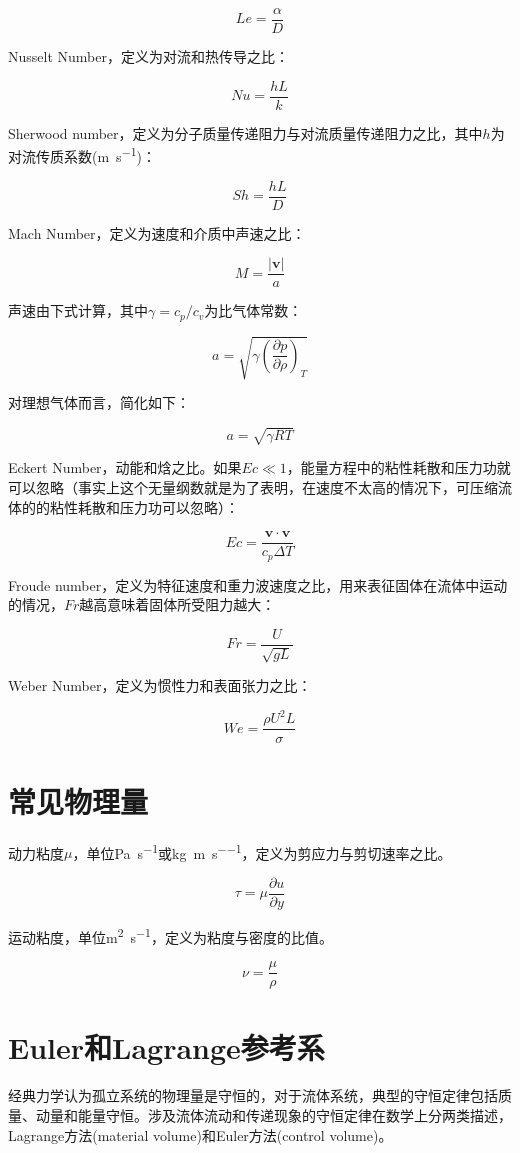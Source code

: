 \[Le = \frac{\alpha}{D}\]

Nusselt Number，定义为对流和热传导之比：

\[Nu = \frac{hL}{k}\]

Sherwood number，定义为分子质量传递阻力与对流质量传递阻力之比，其中$ h $为对流传质系数(\si{\meter\per\second})：

\[Sh = \frac{hL}{D}\]

Mach Number，定义为速度和介质中声速之比：

\[ M = \frac{|\mathbf{v}|}{a} \]

声速由下式计算，其中$ \gamma=c_p/c_v $为比气体常数：

\[a=\sqrt{\gamma\left( \frac{\partial p}{\partial \rho} \right)_T}\]

对理想气体而言，简化如下：

\[a=\sqrt{\gamma RT}\]

Eckert Number，动能和焓之比。如果$ Ec\ll 1 $，能量方程中的粘性耗散和压力功就可以忽略（事实上这个无量纲数就是为了表明，在速度不太高的情况下，可压缩流体的的粘性耗散和压力功可以忽略）：

\[Ec=\frac{\mathbf{v\cdot v}}{c_p\Delta T}\]

Froude number，定义为特征速度和重力波速度之比，用来表征固体在流体中运动的情况，$ Fr $越高意味着固体所受阻力越大：

\[Fr = \frac{U}{\sqrt{gL}}\]

Weber Number，定义为惯性力和表面张力之比：

\[We=\frac{\rho U^2 L}{\sigma}\]

\section{常见物理量}

动力粘度$ \mu $，单位\si{\pascal\per\second}或\si{\kilogram\per\meter\per\second}，定义为剪应力与剪切速率之比。

\[\tau = \mu\frac{\partial u}{\partial y}\]

运动粘度，单位\si{\meter\squared\per\second}，定义为粘度与密度的比值。

\[\nu=\frac{\mu}{\rho} \] 

\section{Euler和Lagrange参考系}

经典力学认为孤立系统的物理量是守恒的，对于流体系统，典型的守恒定律包括质量、动量和能量守恒。涉及流体流动和传递现象的守恒定律在数学上分两类描述，Lagrange方法(material volume)和Euler方法(control volume)。

